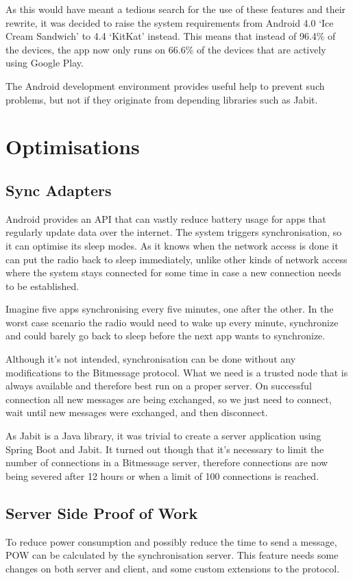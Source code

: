 \documentclass{bfh}
\begin{document}
  As this would have meant a tedious search for the use of these features and their rewrite, it was decided to raise the system requirements from Android 4.0 `Ice Cream Sandwich' to 4.4 `KitKat' instead. This means that instead of 96.4\% of the devices, the app now only runs on 66.6\% of the devices that are actively using Google Play\texttrademark{}.\cite{da:dashboards}

  The Android development environment provides useful help to prevent such problems, but not if they originate from depending libraries such as Jabit.


  \newpage
  \section{Optimisations}
  \subsection{Sync Adapters}
  Android provides an API that can vastly reduce battery usage for apps that regularly update data over the internet. The system triggers synchronisation, so it can optimise its sleep modes. As it knows when the network access is done it can put the radio back to sleep immediately, unlike other kinds of network access where the system stays connected for some time in case a new connection needs to be established.

  Imagine five apps synchronising every five minutes, one after the other. In the worst case scenario the radio would need to wake up every minute, synchronize and could barely go back to sleep before the next app wants to synchronize.

  Although it's not intended, synchronisation can be done without any modifications to the Bitmessage protocol. What we need is a trusted node that is always available and therefore best run on a proper server. On successful connection all new messages are being exchanged, so we just need to connect, wait until new messages were exchanged, and then disconnect.

  As Jabit is a Java library, it was trivial to create a server application using Spring Boot and Jabit. It turned out though that it's necessary to limit the number of connections in a Bitmessage server, therefore connections are now being severed after 12 hours or when a limit of 100 connections is reached.

  \subsection{Server Side Proof of Work}
  To reduce power consumption and possibly reduce the time to send a message, \ac{POW} can be calculated by the synchronisation server. This feature needs some changes on both server and client, and some custom extensions to the protocol.
\end{document}
